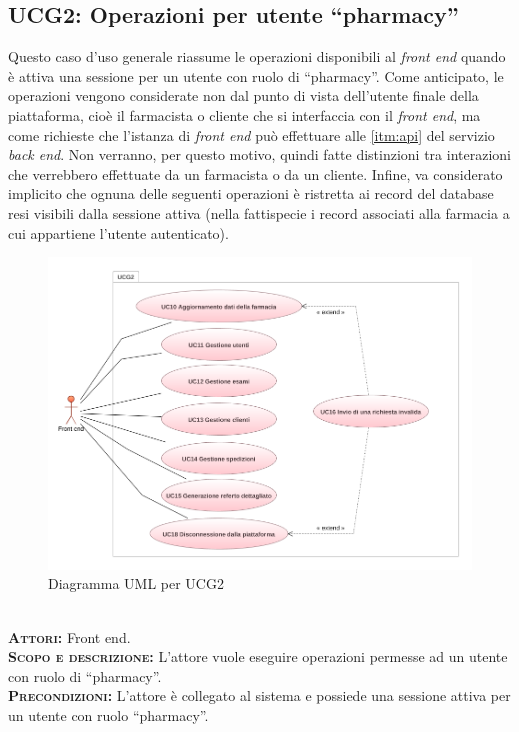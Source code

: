 \subsection{UCG2: Operazioni per utente ``pharmacy''}
\label{sec:UCG2}
Questo caso d'uso generale riassume le operazioni disponibili al \textit{front end} quando è attiva una sessione per un utente con ruolo di ``pharmacy''. Come anticipato, le operazioni vengono considerate non dal punto di vista dell'utente finale della piattaforma, cioè il farmacista o cliente che si interfaccia con il \textit{front end}, ma come richieste che l'istanza di \textit{front end} può effettuare alle \ref{itm:api} del servizio \textit{back end}. Non verranno, per questo motivo, quindi fatte distinzioni tra interazioni che verrebbero effettuate da un farmacista o da un cliente. Infine, va considerato implicito che ognuna delle seguenti operazioni è ristretta ai record del database resi visibili dalla sessione attiva (nella fattispecie i record associati alla farmacia a cui appartiene l'utente autenticato).
\begin{figure}[h!]
    \centering
    \includegraphics[width=\textwidth]{figures/uc/ucg2.png}
    \caption[Diagramma UML per UCG2]{Diagramma UML per UCG2
    \label{fig:ucg2}}
\end{figure}\\
\textsc{\textbf{Attori:}} Front end.\\
\textsc{\textbf{Scopo e descrizione:}} L'attore vuole eseguire operazioni permesse ad un utente con ruolo di ``pharmacy''.\\
\textsc{\textsc{\textbf{Precondizioni:}}} L'attore è collegato al sistema e possiede una sessione attiva per un utente con ruolo ``pharmacy''.\\
